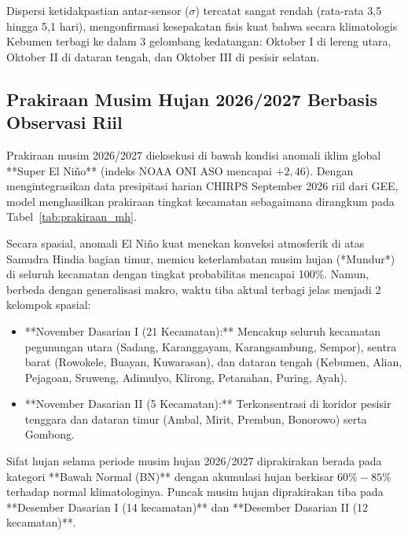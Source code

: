 \documentclass[11pt,a4paper]{article}
\begin{document}
Dispersi ketidakpastian antar-sensor ($\sigma$) tercatat sangat rendah (rata-rata 3,5 hingga 5,1 hari), mengonfirmasi kesepakatan fisis kuat bahwa secara klimatologis Kebumen terbagi ke dalam 3 gelombang kedatangan: Oktober I di lereng utara, Oktober II di dataran tengah, dan Oktober III di pesisir selatan.

\subsection{Prakiraan Musim Hujan 2026/2027 Berbasis Observasi Riil}
Prakiraan musim 2026/2027 dieksekusi di bawah kondisi anomali iklim global **Super El Ni\~no** (indeks NOAA ONI ASO mencapai $+2,46$). Dengan mengintegrasikan data presipitasi harian CHIRPS September 2026 riil dari GEE, model menghasilkan prakiraan tingkat kecamatan sebagaimana dirangkum pada Tabel~\ref{tab:prakiraan_mh}.

\begin{table}[H]
\centering
\caption[Prakiraan Musim Hujan 2026/2027]{Rincian Prakiraan Awal Musim Hujan (AMH), Sifat Hujan, dan Puncak Musim Hujan Tahun 2026/2027 per Kecamatan di Kabupaten Kebumen.}
\label{tab:prakiraan_mh}

\end{table}

Secara spasial, anomali El Ni\~no kuat menekan konveksi atmosferik di atas Samudra Hindia bagian timur, memicu keterlambatan musim hujan (*Mundur*) di seluruh kecamatan dengan tingkat probabilitas mencapai 100\%. Namun, berbeda dengan generalisasi makro, waktu tiba aktual terbagi jelas menjadi 2 kelompok spasial:
\begin{itemize}
    \item **November Dasarian I (21 Kecamatan):** Mencakup seluruh kecamatan pegunungan utara (Sadang, Karanggayam, Karangsambung, Sempor), sentra barat (Rowokele, Buayan, Kuwarasan), dan dataran tengah (Kebumen, Alian, Pejagoan, Sruweng, Adimulyo, Klirong, Petanahan, Puring, Ayah).
    \item **November Dasarian II (5 Kecamatan):** Terkonsentrasi di koridor pesisir tenggara dan dataran timur (Ambal, Mirit, Prembun, Bonorowo) serta Gombong.
\end{itemize}

Sifat hujan selama periode musim hujan 2026/2027 diprakirakan berada pada kategori **Bawah Normal (BN)** dengan akumulasi hujan berkisar $60\% - 85\%$ terhadap normal klimatologinya. Puncak musim hujan diprakirakan tiba pada **Desember Dasarian I (14 kecamatan)** dan **Desember Dasarian II (12 kecamatan)**.
\end{document}
